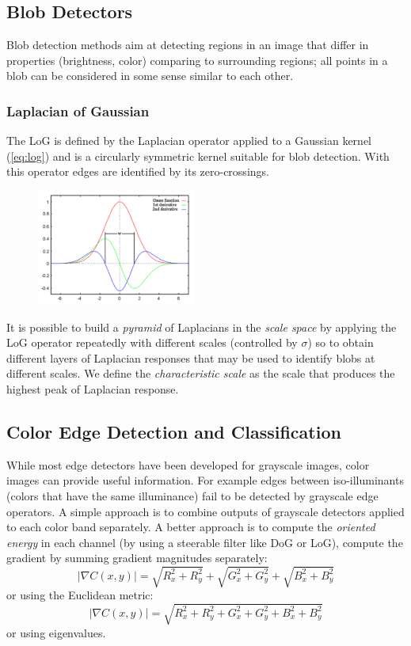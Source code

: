 \documentclass[a4paper,twocolumn]{article}
\begin{document}
\subsection{Blob Detectors}
Blob detection methods aim at detecting regions in an image that differ in
properties (brightness, color) comparing to surrounding regions; all points in a
blob can be considered in some sense similar to each other.

\subsubsection{Laplacian of Gaussian}
The LoG is defined by the Laplacian operator applied to a Gaussian kernel
(\ref{eq:log}) and is a circularly symmetric kernel suitable for blob detection.
With this operator edges are identified by its zero-crossings.
\begin{figure}[htpb]
				\centering
				\includegraphics[height=1.5in]{imgs/gauss-profile.png}
\end{figure}
It is possible to build a \textit{pyramid} of Laplacians in the \textit{scale
space} by applying the LoG operator repeatedly with different scales (controlled
by $\sigma$) so to obtain different layers of Laplacian responses that may be
used to identify blobs at different scales. We define the \textit{characteristic
scale} as the scale that produces the highest peak of Laplacian response.

\subsection{Color Edge Detection and Classification}
While most edge detectors have been developed for grayscale images, color images
can provide useful information. For example edges between iso-illuminants
(colors that have the same illuminance) fail to be detected by grayscale edge
operators. A simple approach is to combine outputs of grayscale detectors
applied to each color band separately. A better approach is to compute the
\textit{oriented energy} in each channel (by using a steerable filter like DoG
or LoG), compute the gradient by summing gradient magnitudes separately:
\begin{equation}
	|\nabla C(x, y)| = \sqrt{R_x^2 + R_y^2} + \sqrt{G_x^2 + G_y^2} + \sqrt{B_x^2 + B_y^2}
\end{equation}
or using the Euclidean metric:
\begin{equation}
	|\nabla C(x,y)| = \sqrt{R_x^2 + R_y^2 + G_x^2 + G_y^2 + B_x^2 + B_y^2}
\end{equation}
or using eigenvalues.
\end{document}
